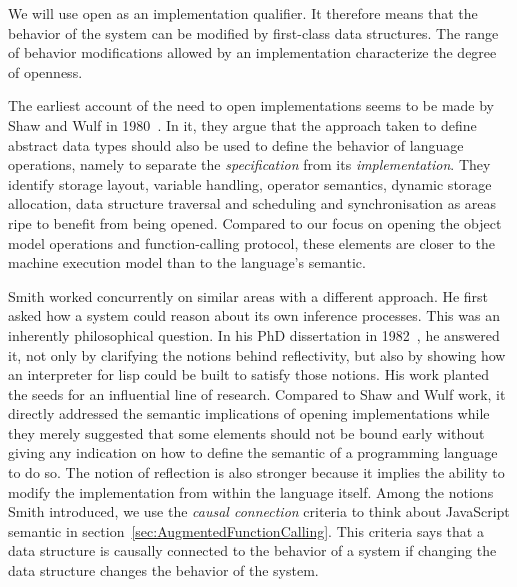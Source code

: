 We will use open as an implementation qualifier. It therefore means that
the behavior of the system can be modified by first-class data structures. The
range of behavior modifications allowed by an implementation characterize the
degree of openness.

The earliest account of the need to open implementations seems to be made by
Shaw and Wulf in 1980~\cite{Shaw:1980}. In it, they argue that the approach
taken to define abstract data types should also be used to define the behavior
of language operations, namely to separate the \textit{specification} from its
\textit{implementation}. They identify storage layout, variable handling,
operator semantics, dynamic storage allocation, data structure traversal and
scheduling and synchronisation as areas ripe to benefit from being opened.
Compared to our focus on opening the object model operations and
function-calling protocol, these elements are closer to the machine execution
model than to the language's semantic. 

Smith worked concurrently on similar areas with a different approach. He
first asked how a system could reason about its own inference processes. This
was an inherently philosophical question. In his PhD dissertation in
1982~\cite{Smith:1982}, he answered it, not only by clarifying the notions
behind reflectivity, but also by showing how an interpreter for lisp could be
built to satisfy those notions. His work planted the seeds for an influential
line of research. Compared to Shaw and Wulf work, it directly addressed the
semantic implications of opening implementations while they merely suggested
that some elements should not be bound early without giving any indication on
how to define the semantic of a programming language to do so.  The notion of
reflection is also stronger because it implies the ability to modify the
implementation from within the language itself. Among the notions Smith
introduced, we use the \textit{causal connection} criteria to think about
JavaScript semantic in section~\ref{sec:AugmentedFunctionCalling}. This
criteria says that a data structure is causally connected to the behavior of a
system if changing the data structure changes the behavior of the system.

